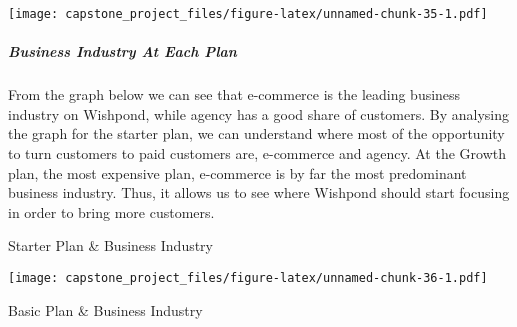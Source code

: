 \documentclass[]{article}
\newenvironment{Shaded}{\begin{snugshade}}{\end{snugshade}}
\newcommand{\KeywordTok}[1]{\textcolor[rgb]{0.13,0.29,0.53}{\textbf{#1}}}
\newcommand{\DataTypeTok}[1]{\textcolor[rgb]{0.13,0.29,0.53}{#1}}
\newcommand{\StringTok}[1]{\textcolor[rgb]{0.31,0.60,0.02}{#1}}
\newcommand{\OperatorTok}[1]{\textcolor[rgb]{0.81,0.36,0.00}{\textbf{#1}}}
\newcommand{\NormalTok}[1]{#1}
\let\oldsubparagraph\subparagraph
\renewcommand{\subparagraph}[1]{\oldsubparagraph{#1}\mbox{}}
\begin{document}
\texttt{[image: capstone\_project\_files/figure-latex/unnamed-chunk-35-1.pdf]}

\subparagraph{Business Industry At Each
Plan}\label{business-industry-at-each-plan}

From the graph below we can see that e-commerce is the leading business
industry on Wishpond, while agency has a good share of customers. By
analysing the graph for the starter plan, we can understand where most
of the opportunity to turn customers to paid customers are, e-commerce
and agency. At the Growth plan, the most expensive plan, e-commerce is
by far the most predominant business industry. Thus, it allows us to see
where Wishpond should start focusing in order to bring more customers.

Starter Plan \& Business Industry

\begin{Shaded}
\end{Shaded}

\texttt{[image: capstone\_project\_files/figure-latex/unnamed-chunk-36-1.pdf]}

Basic Plan \& Business Industry
\end{document}
